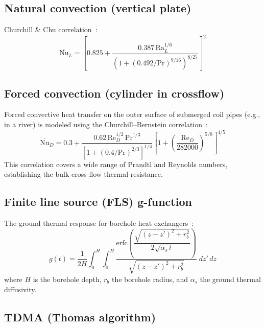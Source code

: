 \subsection{Natural convection (vertical plate)}

Churchill \& Chu correlation~\cite{churchill1975}:
\begin{equation}\label{eq:churchill-chu}
  \overline{\text{Nu}}_L = \left[0.825 + \frac{0.387\,\text{Ra}_L^{1/6}}{\left(1 + (0.492/\text{Pr})^{9/16}\right)^{8/27}}\right]^2
\end{equation}

\subsection{Forced convection (cylinder in crossflow)}

Forced convective heat transfer on the outer surface of submerged coil pipes (e.g., in a river) is modeled using the Churchill--Bernstein correlation~\cite{churchill1977}:
\begin{equation}\label{eq:churchill-bernstein}
  \overline{\text{Nu}}_D = 0.3 + \frac{0.62\,\text{Re}_D^{1/2}\,\text{Pr}^{1/3}}{\left[ 1 + (0.4/\text{Pr})^{2/3} \right]^{1/4}} \left[ 1 + \left( \frac{\text{Re}_D}{282000} \right)^{5/8} \right]^{4/5}
\end{equation}
This correlation covers a wide range of Prandtl and Reynolds numbers, establishing the bulk cross-flow thermal resistance.

\subsection{Finite line source (FLS) g-function}

The ground thermal response for borehole heat exchangers~\cite{eskilson1987}:
\begin{equation}\label{eq:fls-g}
  g(t) = \frac{1}{2H}\int_0^H \int_0^H
    \frac{\text{erfc}\!\left(\dfrac{\sqrt{(z-z')^2 + r_b^2}}{2\sqrt{\alpha_s\,t}}\right)}{\sqrt{(z-z')^2 + r_b^2}}\;dz'\,dz
\end{equation}
where $H$ is the borehole depth, $r_b$ the borehole radius, and $\alpha_s$ the ground thermal diffusivity.

\subsection{TDMA (Thomas algorithm)}

